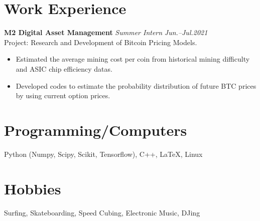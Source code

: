 \documentclass[11pt,a4paper,roman]{moderncv}        %
\begin{document}
\section{Work Experience}

\textbf{M2 Digital Asset Management} \textit{Summer Intern} \hfill \textit{Jun.--Jul.2021}
\vspace*{1mm}\\
{Project: Research and Development of Bitcoin Pricing Models.}
\vspace*{1mm}
\begin{itemize}
	\item Estimated the average mining cost per coin from historical mining difficulty and ASIC chip efficiency datas.
	\item Developed codes to estimate the probability distribution of future BTC prices by using current option prices.
\end{itemize}

\section{Programming/Computers}
{Python (Numpy, Scipy, Scikit, Tensorflow), C++, \LaTeX, Linux}

\section{Hobbies}
{Surfing, Skateboarding, Speed Cubing, Electronic Music, DJing}
\end{document}
